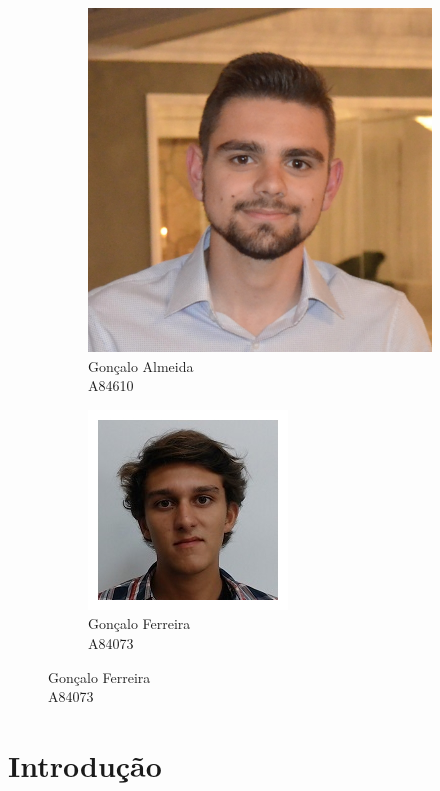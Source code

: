 \documentclass[a4paper, 11pt]{article}
\begin{document}
\begin{figure}[H]
\begin{subfigure}{0.3\textwidth}
        \includegraphics[scale=0.32]{fotos/Almeida.jpg}
        \caption*{Gonçalo Almeida\\A84610}
    \end{subfigure}
    \begin{subfigure}{0.3\textwidth}
        \includegraphics[scale=0.40]{fotos/GFerreira.jpg}
        \caption*{Gonçalo Ferreira\\A84073}
    \end{subfigure}
\end{figure}

\clearpage

\tableofcontents
\listoffigures
\newpage

\section{Introdução}
\end{document}
